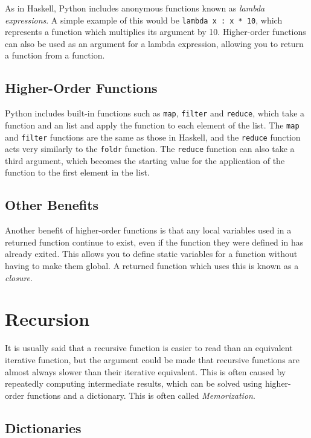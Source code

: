 As in Haskell, Python includes anonymous functions known as \textit{lambda expressions}. A simple example of this would
 be \verb`lambda x : x * 10`, which represents a function which multiplies its argument by 10. Higher-order functions
 can also be used as an argument for a lambda expression, allowing you to return a function from a function.

\subsection*{Higher-Order Functions}

Python includes built-in functions such as \verb`map`, \verb`filter` and \verb`reduce`, which take a function and an
 list and apply the function to each element of the list. The \verb`map` and \verb`filter` functions are the same as
 those in Haskell, and the \verb`reduce` function acts very similarly to the \verb`foldr` function. The \verb`reduce`
 function can also take a third argument, which becomes the starting value for the application of the function to the
 first element in the list.

\subsection*{Other Benefits}

Another benefit of higher-order functions is that any local variables used in a returned function continue to exist,
 even if the function they were defined in has already exited. This allows you to define static variables for a function
 without having to make them global. A returned function which uses this is known as a \textit{closure}.

\section*{Recursion}

It is usually said that a recursive function is easier to read than an equivalent iterative function, but the argument
 could be made that recursive functions are almost always slower than their iterative equivalent. This is often caused
 by repeatedly computing intermediate results, which can be solved using higher-order functions and a dictionary. This
 is often called \textit{Memorization}.

\subsection*{Dictionaries}

